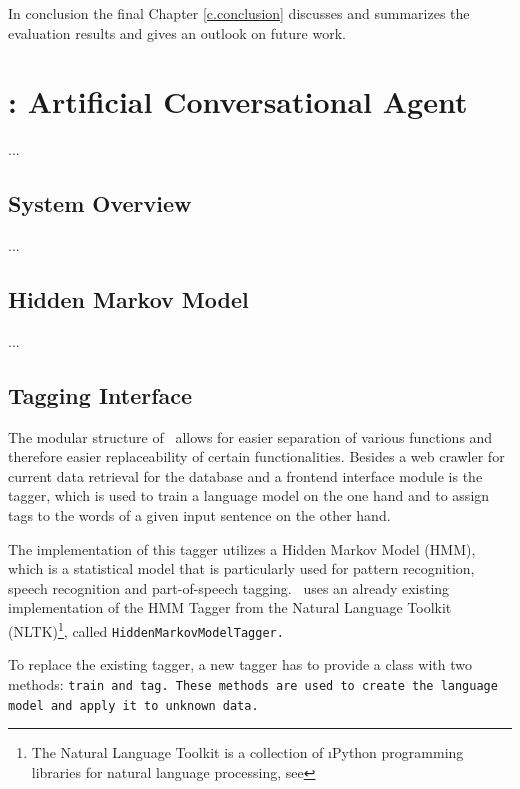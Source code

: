 In conclusion the final Chapter \ref{c.conclusion} discusses and summarizes the evaluation results and gives an outlook on future work.

\chapter{\Alex: Artificial Conversational Agent}\label{c.alex}
...

\section{System Overview}\label{c.alex.overview}
...

\section{Hidden Markov Model}\label{c.alex.hmm}
...

\section{Tagging Interface}\label{c.alex.tagging}
The modular structure of \Alex\ allows for easier separation of various functions and therefore easier replaceability of certain functionalities. Besides a web crawler for current data retrieval for the database and a frontend interface module is the tagger, which is used to train a language model on the one hand and to assign tags to the words of a given input sentence on the other hand.

The implementation of this tagger utilizes a Hidden Markov Model (HMM), which is a statistical model that is particularly used for pattern recognition, speech recognition and part-of-speech tagging. \Alex\ uses an already existing implementation of the HMM Tagger from the Natural Language Toolkit (NLTK)\footnote{The Natural Language Toolkit is a collection of \i{Python} programming libraries for natural language processing, see }, called \tt{HiddenMarkovModelTagger}.

To replace the existing tagger, a new tagger has to provide a class with two methods: \tt{train} and \tt{tag}. These methods are used to create the language model and apply it to unknown data.

